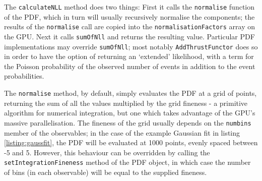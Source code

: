 \documentclass[12pt,pdflatex]{article}
\begin{document}
The \texttt{calculateNLL} method does two things: First it calls the \texttt{normalise}
function of the PDF, which in turn will usually recursively normalise the components;
the results of the \texttt{normalise} call are copied into the \texttt{normalisationFactors}
array on the GPU. Next it calls \texttt{sumOfNll} and returns the resulting value.
Particular PDF implementations may override \texttt{sumOfNll}; most notably
\texttt{AddThrustFunctor} does so in order to have the option of returning
an `extended' likelihood, with a term for the Poisson probability of the observed
number of events in addition to the event probabilities. 

The \texttt{normalise} method, by default, simply evaluates the PDF at a grid of points,
returning the sum of all the values multiplied by the grid fineness - a primitive algorithm
for numerical integration, but one which takes advantage of the GPU's massive parallelisation.
The fineness of the grid usually depends on the \texttt{numbins} member of the observables; in
the case of the example Gaussian fit in listing \ref{listing:gaussfit}, the PDF will be evaluated at 1000 points, evenly
spaced between -5 and 5. However, this behaviour can be overridden by calling the 
\texttt{setIntegrationFineness} method of the PDF object, in which case the number of bins
(in each observable) will be equal to the supplied fineness. 
\end{document}
